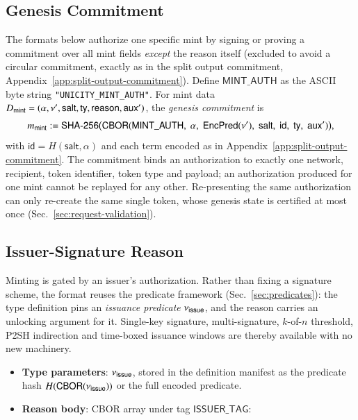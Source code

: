 \subsection{Genesis Commitment}\label{app:genesis-commitment}

The formats below authorize one specific mint by signing or proving a commitment over all mint fields \emph{except} the reason itself (excluded to avoid a circular commitment, exactly as in the split output commitment, Appendix~\ref{app:split-output-commitment}). Define $\mathsf{MINT\_AUTH}$ as the ASCII byte string \texttt{"UNICITY\_MINT\_AUTH"}. For mint data $D_\mathsf{mint} = (\alpha, \nu', \mathsf{salt}, \mathsf{ty}, \mathsf{reason}, \mathsf{aux}')$, the \emph{genesis commitment} is
\[
m_\mathsf{mint} := \mathsf{SHA\text{-}256}\bigl(\mathsf{CBOR}(
	\mathsf{MINT\_AUTH},\;
	\alpha,\;
	\mathsf{EncPred}(\nu'),\;
	\mathsf{salt},\;
	\mathsf{id},\;
	\mathsf{ty},\;
	\mathsf{aux}'
)\bigr),
\]
with $\mathsf{id} = H(\mathsf{salt}, \alpha)$ and each term encoded as in Appendix~\ref{app:split-output-commitment}. The commitment binds an authorization to exactly one network, recipient, token identifier, token type and payload; an authorization produced for one mint cannot be replayed for any other. Re-presenting the same authorization can only re-create the same single token, whose genesis state is certified at most once (Sec.~\ref{sec:request-validation}).

\subsection{Issuer-Signature Reason}\label{app:reason-issuer}

Minting is gated by an issuer's authorization. Rather than fixing a signature scheme, the format reuses the predicate framework (Sec.~\ref{sec:predicates}): the type definition pins an \emph{issuance predicate} $\nu_\mathsf{issue}$, and the reason carries an unlocking argument for it. Single-key signature, multi-signature, $k$-of-$n$ threshold, P2SH indirection and time-boxed issuance windows are thereby available with no new machinery.

\begin{itemize}
	\item \textbf{Type parameters}: $\nu_\mathsf{issue}$, stored in the definition manifest as the predicate hash $H(\mathsf{CBOR}(\nu_\mathsf{issue}))$ or the full encoded predicate.
	\item \textbf{Reason body}: CBOR array under tag $\mathsf{ISSUER\_TAG}$:
\end{itemize}

